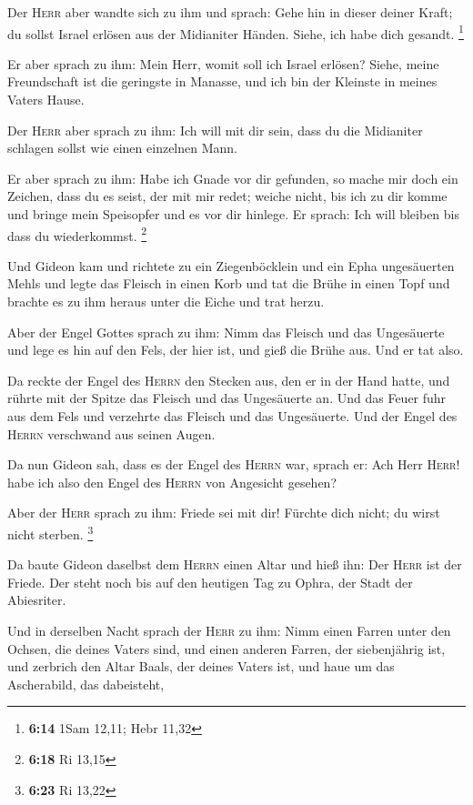  Der \textsc{Herr} aber wandte sich zu ihm und sprach:
Gehe hin in dieser deiner Kraft; du sollst Israel erlösen aus der
Midianiter Händen. Siehe, ich habe dich gesandt. \footnote{\textbf{6:14}
  1Sam 12,11; Hebr 11,32}

 Er aber sprach zu ihm: Mein Herr, womit soll ich Israel
erlösen? Siehe, meine Freundschaft ist die geringste in Manasse, und ich
bin der Kleinste in meines Vaters Hause.

 Der \textsc{Herr} aber sprach zu ihm: Ich will mit dir
sein, dass du die Midianiter schlagen sollst wie einen einzelnen Mann.

 Er aber sprach zu ihm: Habe ich Gnade vor dir gefunden,
so mache mir doch ein Zeichen, dass du es seist, der mit mir redet;
 weiche nicht, bis ich zu dir komme und bringe mein
Speisopfer und es vor dir hinlege. Er sprach: Ich will bleiben bis dass
du wiederkommst. \footnote{\textbf{6:18} Ri 13,15}

 Und Gideon kam und richtete zu ein Ziegenböcklein und
ein Epha ungesäuerten Mehls und legte das Fleisch in einen Korb und tat
die Brühe in einen Topf und brachte es zu ihm heraus unter die Eiche und
trat herzu.

 Aber der Engel Gottes sprach zu ihm: Nimm das Fleisch
und das Ungesäuerte und lege es hin auf den Fels, der hier ist, und gieß
die Brühe aus. Und er tat also.

 Da reckte der Engel des \textsc{Herrn} den Stecken aus,
den er in der Hand hatte, und rührte mit der Spitze das Fleisch und das
Ungesäuerte an. Und das Feuer fuhr aus dem Fels und verzehrte das
Fleisch und das Ungesäuerte. Und der Engel des \textsc{Herrn} verschwand
aus seinen Augen.

 Da nun Gideon sah, dass es der Engel des \textsc{Herrn}
war, sprach er: Ach Herr \textsc{Herr}! habe ich also den Engel des
\textsc{Herrn} von Angesicht gesehen?

 Aber der \textsc{Herr} sprach zu ihm: Friede sei mit
dir! Fürchte dich nicht; du wirst nicht sterben. \footnote{\textbf{6:23}
  Ri 13,22}

 Da baute Gideon daselbst dem \textsc{Herrn} einen Altar
und hieß ihn: Der \textsc{Herr} ist der Friede. Der steht noch bis auf
den heutigen Tag zu Ophra, der Stadt der Abiesriter.

 Und in derselben Nacht sprach der \textsc{Herr} zu ihm:
Nimm einen Farren unter den Ochsen, die deines Vaters sind, und einen
anderen Farren, der siebenjährig ist, und zerbrich den Altar Baals, der
deines Vaters ist, und haue um das Ascherabild, das dabeisteht,

